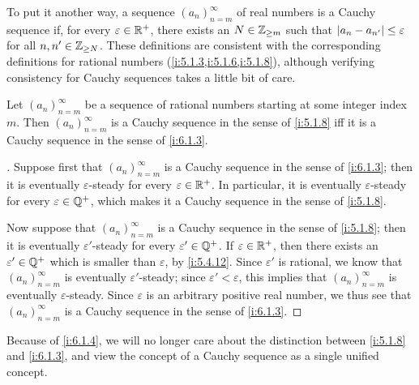 \begin{note}
  To put it another way, a sequence \((a_n)_{n = m}^\infty\) of real numbers is a Cauchy sequence if, for every \(\varepsilon \in \mathbb{R}^+\), there exists an \(N \in \mathbb{Z}_{\geq m}\) such that \(\left\lvert a_n - a_{n'}\right\rvert \leq \varepsilon\) for all \(n, n' \in \mathbb{Z}_{\geq N}\).
  These definitions are consistent with the corresponding definitions for rational numbers (\cref{i:5.1.3,i:5.1.6,i:5.1.8}), although verifying consistency for Cauchy sequences takes a little bit of care.
\end{note}

\begin{prop}\label{i:6.1.4}
  Let \((a_n)_{n = m}^\infty\) be a sequence of rational numbers starting at some integer index \(m\).
  Then \((a_n)_{n = m}^\infty\) is a Cauchy sequence in the sense of \cref{i:5.1.8} iff it is a Cauchy sequence in the sense of \cref{i:6.1.3}.
\end{prop}

\begin{proof}[]
  Suppose first that \((a_n)_{n = m}^\infty\) is a Cauchy sequence in the sense of \cref{i:6.1.3};
  then it is eventually \(\varepsilon\)-steady for every \(\varepsilon \in \mathbb{R}^+\).
  In particular, it is eventually \(\varepsilon\)-steady for every \(\varepsilon \in \mathbb{Q}^+\), which makes it a Cauchy sequence in the sense of \cref{i:5.1.8}.

  Now suppose that \((a_n)_{n = m}^\infty\) is a Cauchy sequence in the sense of \cref{i:5.1.8};
  then it is eventually \(\varepsilon'\)-steady for every \(\varepsilon' \in \mathbb{Q}^+\).
  If \(\varepsilon \in \mathbb{R}^+\), then there exists an \(\varepsilon' \in \mathbb{Q}^+\) which is smaller than \(\varepsilon\), by \cref{i:5.4.12}.
  Since \(\varepsilon'\) is rational, we know that \((a_n)_{n = m}^\infty\) is eventually \(\varepsilon'\)-steady;
  since \(\varepsilon' < \varepsilon\), this implies that \((a_n)_{n = m}^\infty\) is eventually \(\varepsilon\)-steady.
  Since \(\varepsilon\) is an arbitrary positive real number, we thus see that \((a_n)_{n = m}^\infty\) is a Cauchy sequence in the sense of \cref{i:6.1.3}.
\end{proof}

\begin{note}
  Because of \cref{i:6.1.4}, we will no longer care about the distinction between \cref{i:5.1.8} and \cref{i:6.1.3}, and view the concept of a Cauchy sequence as a single unified concept.
\end{note}

